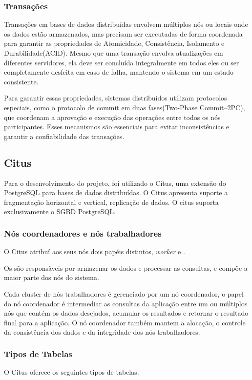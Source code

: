 \subsubsection{Transações}
Transações em bases de dados distribuídas envolvem múltiplos nós ou locais onde os dados estão armazenados,
mas precisam ser executadas de forma coordenada para garantir as propriedades de Atomicidade, Consistência, Isolamento e Durabilidade(ACID).
Mesmo que uma transação envolva atualizações em diferentes servidores, 
ela deve ser concluída integralmente em todos eles ou ser completamente desfeita em caso de falha,
mantendo o sistema em um estado consistente.

Para garantir essas propriedades,
sistemas distribuídos utilizam protocolos especiais,
como o protocolo de commit em duas fases(Two-Phase Commit–2PC),
que coordenam a aprovação e execução das operações entre todos os nós participantes. 
Esses mecanismos são essenciais para evitar inconsistências e garantir a confiabilidade das transações.


\subsection{Citus}
Para o desenvolvimento do projeto, foi utilizado o Citus, uma extensão do PostgreSQL para bases de dados distribuídas.
O Citus apresenta suporte a fragmentação horizontal e vertical, replicação de dados. 
O citus suporta exclusivamente o SGBD PostgreSQL.


\subsubsection{Nós coordenadores e nós trabalhadores}

O  Citus atribuí aos seus nós dois papéis distintos, 
\textit{worker} e .

Os  são responsãveis por armazenar os dados e processar as consultas,
e compõe a maior parte dos nós do sistema.

Cada cluster de nós trabalhadores é gerenciado por um nó coordenador,
o papel do nó coordenador é intermediar as consultas da aplicação entre um ou múltiplos
nós que contém os dados desejados, acumular os resultados e retornar o resultado final para a aplicação.  
O nó coordenador também mantem a alocação, o controle da consistência dos dados 
e da integridade dos nós trabalhadores.

\subsubsection{Tipos de Tabelas}
O Citus oferece os seguintes tipos de tabelas:

